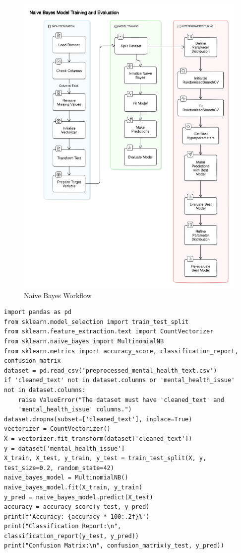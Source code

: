 \begin{figure}[h!]  
    \centering
    \includegraphics[width=1.0\textwidth]{Images/Naive Bayes.png}  
    \caption{Naive Bayes Workflow}
    \label{Naive Bayes}  %
\end{figure}

\begin{verbatim}
import pandas as pd
from sklearn.model_selection import train_test_split
from sklearn.feature_extraction.text import CountVectorizer
from sklearn.naive_bayes import MultinomialNB
from sklearn.metrics import accuracy_score, classification_report, 
confusion_matrix
dataset = pd.read_csv('preprocessed_mental_health_text.csv')
if 'cleaned_text' not in dataset.columns or 'mental_health_issue' 
not in dataset.columns:
    raise ValueError("The dataset must have 'cleaned_text' and 
    'mental_health_issue' columns.")
dataset.dropna(subset=['cleaned_text'], inplace=True)
vectorizer = CountVectorizer()
X = vectorizer.fit_transform(dataset['cleaned_text'])
y = dataset['mental_health_issue']
X_train, X_test, y_train, y_test = train_test_split(X, y, 
test_size=0.2, random_state=42)
naive_bayes_model = MultinomialNB()
naive_bayes_model.fit(X_train, y_train)
y_pred = naive_bayes_model.predict(X_test)
accuracy = accuracy_score(y_test, y_pred)
print(f'Accuracy: {accuracy * 100:.2f}%')
print("Classification Report:\n", 
classification_report(y_test, y_pred))
print("Confusion Matrix:\n", confusion_matrix(y_test, y_pred))
\end{verbatim}

